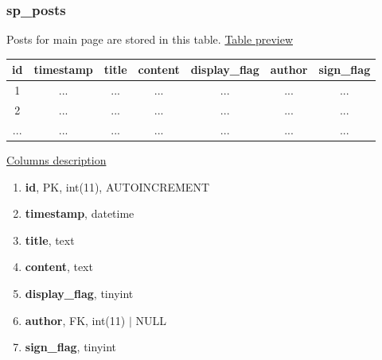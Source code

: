 \subsubsection*{sp\_posts}
Posts for main page are stored in this table.
\newline
\underline{Table preview}
\begin{center}
  \begin{tabular}{||c c c c c c c||} 
  \hline
  id & timestamp & title & content & display\_flag & author & sign\_flag  \\ [0.5ex] 
  \hline\hline
  1 & ... & ... & ... & ... & ... & ... \\ 
  \hline
  2 & ... & ... & ... & ... & ... & ... \\ 
 \hline
  ... & ... & ... & ... & ... & ...  & ... \\ [0.5ex] 
  \hline
  \end{tabular}
\end{center}
\underline{Columns description}
\begin{enumerate}
  \setlength\itemsep{0em}
  \item \textbf{id}, PK, int(11), AUTOINCREMENT
  \item \textbf{timestamp}, datetime
  \item \textbf{title}, text
  \item \textbf{content}, text
  \item \textbf{display\_flag}, tinyint
  \item \textbf{author}, FK, int(11) $|$ NULL
  \item \textbf{sign\_flag}, tinyint
\end{enumerate}

